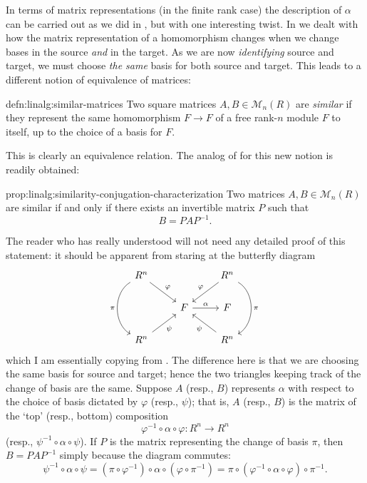 In terms of matrix representations (in the finite rank case) the
description of $\alpha$ can be carried out as we did in
, but with one
interesting twist. In  we dealt
with how the matrix representation of a homomorphism changes when we
change bases in the source \emph{and} in the target. As we are now
\emph{identifying} source and target, we must choose \emph{the same}
basis for both source and target. This leads to a different notion of
equivalence of matrices:
\begin{defn}{}{defn:linalg:similar-matrices}
  Two square matrices $A, B \in \mathcal{M}_n(R)$ are \emph{similar}
  if they represent the same homomorphism $F \to F$ of a free rank-$n$
  module $F$ to itself, up to the choice of a basis for $F$.
\end{defn}
This is clearly an equivalence relation. The analog of
 for this new notion is readily obtained:
\begin{prop}{}{prop:linalg:similarity-conjugation-characterization}
  Two matrices $A, B \in \mathcal{M}_n(R)$ are similar if and only if
  there exists an invertible matrix $P$ such that
  \[
    B = PAP^{-1}.
  \]
\end{prop}
The reader who has really understood  will not need
any detailed proof of this statement: it should be apparent from
staring at the butterfly diagram
\[
  \begin{tikzcd}
    R^n \arrow[dr, "\varphi"] \arrow[dd, bend right=60, "\pi"'] & &
    R^n \arrow[dl, "\varphi"'] \arrow[dd, bend left=60, "\pi"] \\
    & F \arrow[r, "\alpha"] & F & \\
    R^n \arrow[ur, "\psi"'] & & R^n \arrow[ul, "\psi"]
  \end{tikzcd}
\]
which I am essentially copying from
. The difference here is that
we are choosing the same basis for source and target; hence the two
triangles keeping track of the change of basis are the same.  Suppose
$A$ (resp., $B$) represents $\alpha$ with respect to the choice of
basis dictated by $\varphi$ (resp., $\psi$); that is, $A$ (resp., $B$)
is the matrix of the `top' (resp., bottom) composition
\[
  \varphi^{-1} \circ \alpha \circ \varphi : R^n \to R^n
\]
(resp., $\psi^{-1} \circ \alpha \circ \psi$). If $P$ is the matrix
representing the change of basis $\pi$, then $B = PAP^{-1}$ simply
because the diagram commutes:
\[
  \psi^{-1} \circ \alpha \circ \psi = (\pi \circ \varphi^{-1}) \circ
  \alpha \circ (\varphi \circ \pi^{-1}) = \pi \circ (\varphi^{-1}
  \circ \alpha \circ \varphi) \circ \pi^{-1}.
\]

